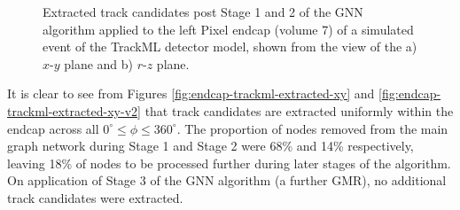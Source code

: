 \begin{figure}[htbp]%
    \centering
    \hfill
    \caption{Extracted track candidates post Stage 1 and 2 of the GNN algorithm applied to the left Pixel endcap (volume 7) of a simulated event of the TrackML detector model, shown from the view of the a) $x$-$y$ plane and b) $r$-$z$ plane.}%
    \label{fig:trackml-results-endcap-extracted-v2}%
\end{figure}

It is clear to see from Figures \ref{fig:endcap-trackml-extracted-xy} and \ref{fig:endcap-trackml-extracted-xy-v2} that track candidates are extracted uniformly within the endcap across all $ 0^{\circ} \leq \phi \leq 360^{\circ}$. The proportion of nodes removed from the main graph network during Stage 1 and Stage 2 were 68\% and 14\% respectively, leaving 18\% of nodes to be processed further during later stages of the algorithm. On application of Stage 3 of the GNN algorithm (a further GMR), no additional track candidates were extracted.

